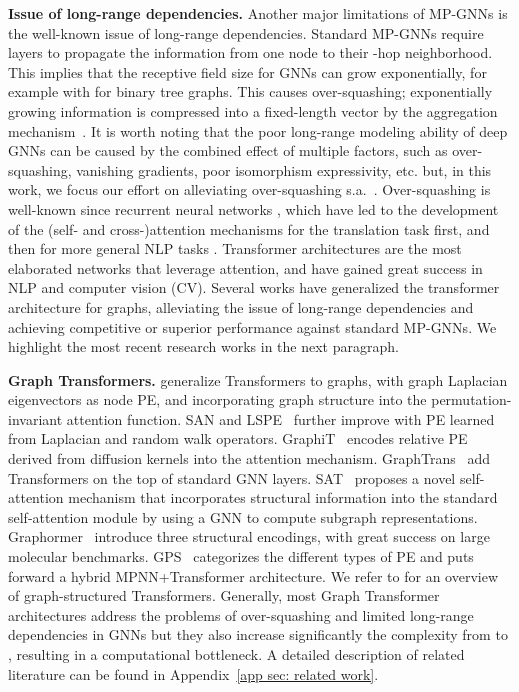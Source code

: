 \documentclass{article}
\begin{document}
{\bf Issue of long-range dependencies.}
Another major limitations of MP-GNNs is the well-known issue of long-range dependencies. Standard MP-GNNs require  layers to propagate the information from one node to their -hop neighborhood. This implies that the receptive field size for GNNs can grow exponentially, for example with  for binary tree graphs. This causes over-squashing; exponentially growing information  is compressed into a fixed-length vector 
by the aggregation mechanism~\citep{alon2020bottleneck, ToppingGC0B22}. 
It is worth noting that the poor long-range modeling ability of deep GNNs can be caused by the combined effect of multiple factors, such as over-squashing, vanishing gradients, poor isomorphism expressivity, etc. but, in this work, we focus our effort on alleviating over-squashing s.a.~\citet{deac2022expander,arnaiz2022diffwire}.
Over-squashing is well-known since recurrent neural networks \citep{hochreiter1997long}, which have led to the development of the (self- and cross-)attention mechanisms for the translation task \citep{bahdanau2014neural,vaswani2017attention} first, and then for more general NLP tasks \citep{devlin2018bert,brown2020language}. 
Transformer architectures are the most elaborated networks that leverage attention, and have gained great success in NLP and computer vision (CV).
Several works have generalized the transformer architecture for graphs, alleviating the issue of long-range dependencies and achieving competitive or superior performance against standard MP-GNNs. 
We highlight the most recent research works in the next paragraph.



\textbf{Graph Transformers.} \citet{dwivedi2021generalization} generalize Transformers to graphs, with graph Laplacian eigenvectors as node PE, and incorporating graph structure into the permutation-invariant attention function. SAN and LSPE~\citep{kreuzer2021rethinking,dwivedi2021graph} further improve with PE learned from Laplacian and random walk operators. GraphiT~\citep{mialon2021graphit} encodes relative PE derived from diffusion kernels into the attention mechanism. GraphTrans~\citep{wu2021GraphTrans} add Transformers on the top of standard GNN layers. SAT~\citep{chen2022structure_SAT} proposes a novel self-attention mechanism that incorporates structural information into the standard self-attention module by using a GNN to compute subgraph representations.
Graphormer~\citep{ying2021graphormer} introduce three structural encodings, with great success on large molecular benchmarks. GPS~\citep{rampavsek2022recipe} categorizes the different types of PE and puts forward a hybrid MPNN+Transformer architecture. We refer to \citet{min2022transformer} for an overview of graph-structured Transformers. Generally, most Graph Transformer architectures address the problems of over-squashing and limited long-range dependencies in GNNs but they also increase significantly the complexity from  to , resulting in a computational bottleneck. A detailed description of related literature can be found in Appendix~\ref{app sec: related work}.
\end{document}
